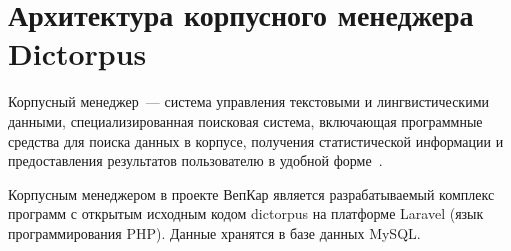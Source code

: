 
\section{Архитектура корпусного менеджера Dictorpus} \label{sect_arch_corpus_manager}

Корпусный менеджер~--- система управления текстовыми и лингвистическими данными, 
специализированная поисковая система, включающая программные средства для поиска данных в корпусе, получения статистической информации и предоставления результатов пользователю 
в удобной форме~\cite[с.~3]{Zakharov2005}.

Корпусным менеджером в проекте ВепКар является разрабатываемый комплекс программ с открытым исходным кодом dictorpus на платформе Laravel (язык программирования PHP). Данные хранятся в базе данных MySQL.


